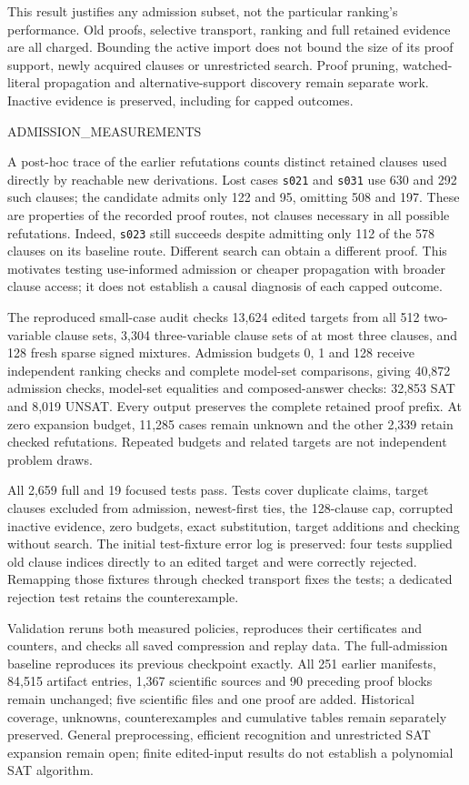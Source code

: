 This result justifies any admission subset, not the particular ranking's
performance.  Old proofs, selective transport, ranking and full retained evidence
are all charged.  Bounding the active import does not bound the size of its
proof support, newly acquired clauses or unrestricted search.  Proof pruning,
watched-literal propagation and alternative-support discovery remain separate
work.  Inactive evidence is preserved, including for capped outcomes.

ADMISSION_MEASUREMENTS

A post-hoc trace of the earlier refutations counts distinct retained clauses
used directly by reachable new derivations.  Lost cases \texttt{s021} and
\texttt{s031} use 630 and 292 such clauses; the candidate admits only 122 and
95, omitting 508 and 197.  These are properties of the recorded proof routes,
not clauses necessary in all possible refutations.  Indeed, \texttt{s023}
still succeeds despite admitting only 112 of the 578 clauses on its baseline
route.  Different search can obtain a different proof.  This motivates testing
use-informed admission or cheaper propagation with broader clause access; it
does not establish a causal diagnosis of each capped outcome.

The reproduced small-case audit checks 13,624 edited targets from all 512
two-variable clause sets, 3,304 three-variable clause sets of at most three
clauses, and 128 fresh sparse signed mixtures.  Admission budgets 0, 1 and 128
receive independent ranking checks and complete model-set comparisons, giving
40,872 admission checks, model-set equalities and composed-answer checks:
32,853 SAT and 8,019 UNSAT.  Every output preserves the complete retained
proof prefix.  At zero expansion budget, 11,285 cases remain unknown and the
other 2,339 retain checked refutations.  Repeated budgets and related targets
are not independent problem draws.

All 2,659 full and 19 focused tests pass.  Tests cover duplicate claims, target
clauses excluded from admission, newest-first ties, the 128-clause cap, corrupted
inactive evidence, zero budgets, exact substitution, target additions and
checking without search.  The initial test-fixture error log is preserved:
four tests supplied old clause indices directly to an edited target and were
correctly rejected.  Remapping those fixtures through checked transport fixes
the tests; a dedicated rejection test retains the counterexample.

Validation reruns both measured policies, reproduces their certificates and
counters, and checks all saved compression and replay data.  The full-admission
baseline reproduces its previous checkpoint exactly.  All 251 earlier manifests,
84,515 artifact entries, 1,367 scientific sources and 90 preceding proof blocks
remain unchanged; five scientific files and one proof are added.  Historical
coverage, unknowns, counterexamples and cumulative tables remain separately
preserved.  General preprocessing, efficient recognition and unrestricted SAT
expansion remain open; finite edited-input results do not establish a polynomial
SAT algorithm.
